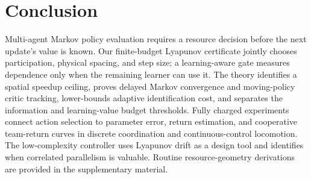 \documentclass[journal]{IEEEtran}
\begin{document}
\section{Conclusion}
Multi-agent Markov policy evaluation requires a resource decision before the next update's value is known.
Our finite-budget Lyapunov certificate jointly chooses participation, physical spacing, and step size; a learning-aware gate measures dependence only when the remaining learner can use it.
The theory identifies a spatial speedup ceiling, proves delayed Markov convergence and moving-policy critic tracking, lower-bounds adaptive identification cost, and separates the information and learning-value budget thresholds.
Fully charged experiments connect action selection to parameter error, return estimation, and cooperative team-return curves in discrete coordination and continuous-control locomotion.
The low-complexity controller uses Lyapunov drift as a design tool and identifies when correlated parallelism is valuable.
Routine resource-geometry derivations are provided in the supplementary material.

\appendices



\end{document}
